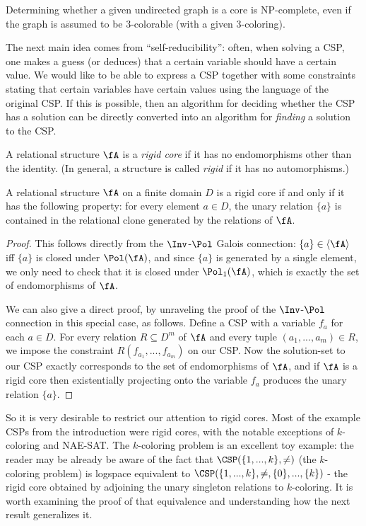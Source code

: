 \begin{thm}  Determining whether a given undirected graph is a core is NP-complete, even if the graph is assumed to be $3$-colorable (with a given $3$-coloring).
\end{thm}

The next main idea comes from ``self-reducibility'': often, when solving a CSP, one makes a guess (or deduces) that a certain variable should have a certain value. We would like to be able to express a CSP together with some constraints stating that certain variables have certain values using the language of the original CSP. If this is possible, then an algorithm for deciding whether the CSP has a solution can be directly converted into an algorithm for \emph{finding} a solution to the CSP.

\begin{defn} A relational structure $\fA$ is a \emph{rigid core} if it has no endomorphisms other than the identity. (In general, a structure is called \emph{rigid} if it has no automorphisms.)
\end{defn}

\begin{thm} A relational structure $\fA$ on a finite domain $D$ is a rigid core if and only if it has the following property: for every element $a \in D$, the unary relation $\{a\}$ is contained in the relational clone generated by the relations of $\fA$.
\end{thm}
\begin{proof} This follows directly from the $\Inv$-$\Pol$ Galois connection: $\{a\} \in \langle \fA \rangle$ iff $\{a\}$ is closed under $\Pol(\fA)$, and since $\{a\}$ is generated by a single element, we only need to check that it is closed under $\Pol_1(\fA)$, which is exactly the set of endomorphisms of $\fA$.

We can also give a direct proof, by unraveling the proof of the $\Inv$-$\Pol$ connection in this special case, as follows. Define a CSP with a variable $f_a$ for each $a \in D$. For every relation $R \subseteq D^m$ of $\fA$ and every tuple $(a_1, ..., a_m) \in R$, we impose the constraint $R(f_{a_1}, ..., f_{a_m})$ on our CSP. Now the solution-set to our CSP exactly corresponds to the set of endomorphisms of $\fA$, and if $\fA$ is a rigid core then existentially projecting onto the variable $f_a$ produces the unary relation $\{a\}$.
\end{proof}

So it is very desirable to restrict our attention to rigid cores. Most of the example CSPs from the introduction were rigid cores, with the notable exceptions of $k$-coloring and NAE-SAT. The $k$-coloring problem is an excellent toy example: the reader may be already be aware of the fact that $\CSP(\{1, ..., k\}, \ne)$ (the $k$-coloring problem) is logspace equivalent to $\CSP(\{1,...,k\}, \ne, \{0\}, ..., \{k\})$ - the rigid core obtained by adjoining the unary singleton relations to $k$-coloring. It is worth examining the proof of that equivalence and understanding how the next result generalizes it.


